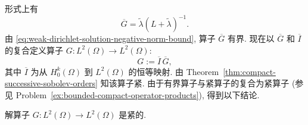 形式上有
\begin{equation}\label{eq:elliptic-sobolev-solution-operator-formal-inverse}
\overline G=\widetilde\lambda(L+\widetilde\lambda)^{-1}.
\end{equation}
由 \eqref{eq:weak-dirichlet-solution-negative-norm-bound}, 算子 $\overline G$ 有界. 现在以 $\overline G$ 和 $\overline I$ 的复合定义算子 $G:L^2(\Omega)\to L^2(\Omega)$:
\begin{equation}\label{eq:elliptic-l2-compact-solution-operator-definition}
G:=\overline I\,\overline G,
\end{equation}
其中 $\overline I$ 为从 $H_0^k(\Omega)$ 到 $L^2(\Omega)$ 的恒等映射. 由 Theorem~\ref{thm:compact-successive-sobolev-orders} 知该算子紧. 由于有界算子与紧算子的复合为紧算子 (参见 Problem~\ref{ex:bounded-compact-operator-products}), 得到以下结论.

\begin{Lemma}
\label{lem:elliptic-l2-solution-operator-compact}
解算子 $G:L^2(\Omega)\to L^2(\Omega)$ 是紧的.
\end{Lemma}
